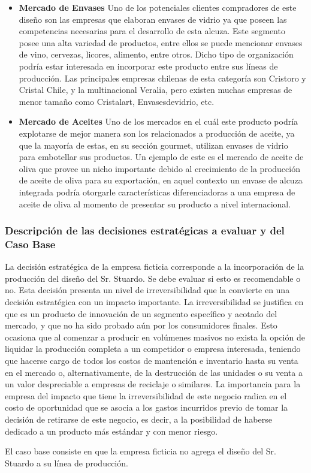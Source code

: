 \begin{itemize}
\item \textbf{Mercado de Envases}
Uno de los potenciales clientes compradores de este diseño son las empresas que elaboran envases de vidrio ya que poseen las competencias necesarias para el desarrollo de esta alcuza. Este segmento posee una alta variedad de productos, entre ellos se puede mencionar envases de vino, cervezas, licores, alimento, entre otros. Dicho tipo de organización podría estar interesada en incorporar este producto entre sus líneas de producción. Las principales empresas chilenas de esta categoría son Cristoro y Cristal Chile, y la multinacional Veralia, pero existen muchas empresas de menor tamaño como Cristalart, Envasesdevidrio, etc.

\item \textbf{Mercado de Aceites}
Uno de los mercados en el cuál este producto podría explotarse de mejor manera son los relacionados a producción de aceite, ya que la mayoría de estas, en su sección gourmet, utilizan envases de vidrio para embotellar sus productos. Un ejemplo de este es el mercado de aceite de oliva que provee un nicho importante debido al crecimiento de la producción de aceite de oliva para su exportación, en aquel contexto un envase de alcuza integrada podría otorgarle características diferenciadoras a una empresa de aceite de oliva al momento de presentar su producto a nivel internacional.
\end{itemize}

\subsubsection{Descripción de las decisiones estratégicas a evaluar y del Caso Base}

La decisión estratégica de la empresa ficticia corresponde a la incorporación de la producción del diseño del Sr. Stuardo. Se debe evaluar si esto es recomendable o no. Esta decisión presenta un nivel de irreversibilidad que la convierte en una decisión estratégica con un impacto importante. La irreversibilidad se justifica en que es un producto de innovación de un segmento específico y acotado del mercado, y que no ha sido probado aún por los consumidores finales. Esto ocasiona que al comenzar a producir en volúmenes masivos no exista la opción de liquidar la producción completa a un competidor o empresa interesada, teniendo que hacerse cargo de todos los costos de mantención e inventario hasta su venta en el mercado o, alternativamente, de la destrucción de las unidades o su venta a un valor despreciable a empresas de reciclaje o similares. La importancia para la empresa del impacto que tiene la irreversibilidad de este negocio radica en el costo de oportunidad que se asocia a los gastos incurridos previo de tomar la decisión de retirarse de este negocio, es decir, a la posibilidad de haberse dedicado a un producto más estándar y con menor riesgo.

El caso base consiste en que la empresa ficticia no agrega el diseño del Sr. Stuardo a su línea de producción.
